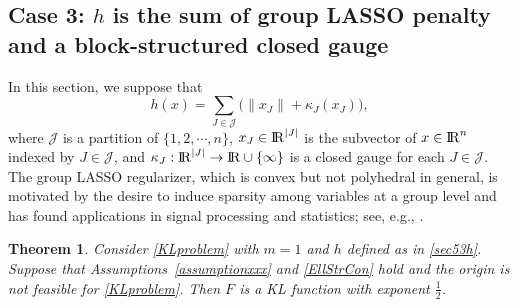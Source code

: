 \documentclass[10pt]{article}
\numberwithin{equation}{section}
\newtheorem{theorem}{Theorem}[section]
\def\R{{\rm I\!R}}
\begin{document}
\subsection{Case 3: $h$ is the sum of group LASSO penalty and a block-structured closed gauge}
In this section, we suppose that
\begin{equation}\label{sec53h}
  h(x) = \sum\limits_{J\in\mathcal{J}}\big(\|x_J\| + \kappa_J(x_J)\big),
\end{equation}
where $\mathcal{J}$ is a partition of $\{1,2,\cdots, n\}$, $x_J\in\R^{|J|}$ is the subvector of $x\in \R^n$ indexed by $J\in\mathcal{J}$, and $\kappa_J: \R^{|J|} \to \R\cup\{\infty\}$ is a closed gauge for each $J\in\mathcal{J}$. The group LASSO regularizer, which is convex but not polyhedral in general, is motivated by the desire to induce sparsity among variables at a group level and has found applications in signal processing and statistics; see, e.g., \cite{ElMi09,YuLi06}.
\begin{theorem}\label{KLGL}
Consider \eqref{KLproblem} with $m = 1$ and $h$ defined as in \eqref{sec53h}. Suppose that Assumptions~\ref{assumptionxxx} and \ref{EllStrCon} hold and the origin is not feasible for \eqref{KLproblem}. Then $F$ is a KL function with exponent $\frac{1}{2}$.
\end{theorem}
\end{document}
